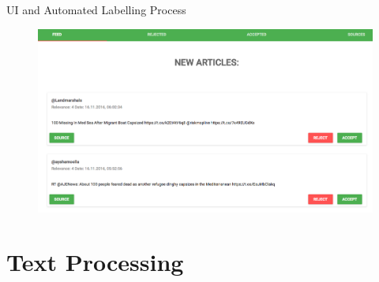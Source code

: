 \documentclass{beamer}
\begin{document}
\begin{frame}{UI and Automated Labelling Process}

\begin{figure}[H]
\centering
\includegraphics[scale=0.25]{UI.png}
\label{heat}
\end{figure}

\href{http://migrantnews-web.s3-website-eu-west-1.amazonaws.com/}{}

\end{frame}

\section{Text Processing}

\end{document}
